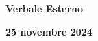 \begin{center}
  \Huge\textbf{Verbale Esterno}

  \Large\textbf{25 novembre 2024}
\end{center}

\bigskip


